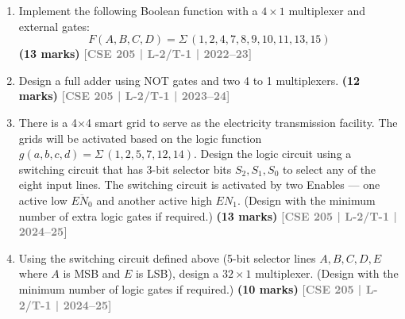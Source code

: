 \documentclass[12pt,a4paper]{article}
\newcommand{\yr}[1]{\hfill\textcolor{gray}{\small\textbf{[#1]}}}
\newcommand{\mk}[1]{\textcolor{orange!70!black}{\small\textbf{(#1 marks)}}}
\begin{document}
\begin{enumerate}
\begin{center}
\end{center}

\mk{12} \yr{CSE 205 | L-2/T-1 | 2021--22}

\item Implement the following Boolean function with a $4 \times 1$ multiplexer and external gates:
\[ F(A, B, C, D) = \Sigma\,(1, 2, 4, 7, 8, 9, 10, 11, 13, 15) \]
\mk{13} \yr{CSE 205 | L-2/T-1 | 2022--23}

\item Design a full adder using NOT gates and two 4 to 1 multiplexers.
\mk{12} \yr{CSE 205 | L-2/T-1 | 2023--24}

\item There is a 4$\times$4 smart grid to serve as the electricity transmission facility. The grids will be activated based on the logic function $g(a,b,c,d) = \Sigma\,(1,2,5,7,12,14)$. Design the logic circuit using a switching circuit that has 3-bit selector bits $S_2, S_1, S_0$ to select any of the eight input lines. The switching circuit is activated by two Enables — one active low $\overline{EN_0}$ and another active high $EN_1$. (Design with the minimum number of extra logic gates if required.)
\mk{13} \yr{CSE 205 | L-2/T-1 | 2024--25}

\item Using the switching circuit defined above (5-bit selector lines $A, B, C, D, E$ where $A$ is MSB and $E$ is LSB), design a $32\times1$ multiplexer. (Design with the minimum number of logic gates if required.)
\mk{10} \yr{CSE 205 | L-2/T-1 | 2024--25}

\end{enumerate}
\end{document}
